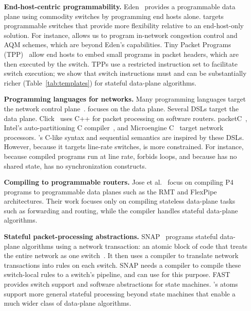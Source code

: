 \medskip
\noindent
\textbf{End-host-centric programmability.}
Eden~\cite{eden} provides a programmable data plane using commodity switches by
programming end hosts alone. \pktlanguage targets programmable switches that
provide more flexibility relative to an end-host-only solution. For instance,
\pktlanguage allows us to program in-network congestion control and AQM
schemes, which are beyond Eden's capabilities.  Tiny Packet Programs
(TPP)~\cite{tpp} allow end hosts to embed small programs in packet headers,
which are then executed by the switch. TPPs use a restricted instruction set to
facilitate switch execution; we show that switch instructions must and can be
substantially richer (Table~\ref{tab:templates}) for stateful data-plane
algorithms.

\medskip
\noindent
\textbf{Programming languages for networks.} Many programming languages target
the network control plane~\cite{frenetic, maple}. \pktlanguage focuses on the
data plane. Several DSLs target the data plane. Click~\cite{click} uses C++ for
packet processing on software routers. packetC~\cite{packetc}, Intel's
auto-partitioning C compiler~\cite{intel_uiuc_pldi}, and Microengine
C~\cite{microenginec} target network processors. \pktlanguage's C-like syntax
and sequential semantics are inspired by these DSLs. However, because it
targets line-rate switches, \pktlanguage is more constrained. For instance,
because compiled programs run at line rate, \pktlanguage forbids loops, and
because \absmachine has no shared state, \pktlanguage has no synchronization
constructs.

\medskip
\noindent
\textbf{Compiling to programmable routers.}
Jose et al.~\cite{lavanya_compiler} focus on compiling P4 programs to
programmable data planes such as the RMT and FlexPipe architectures. Their work
focuses only on compiling stateless data-plane tasks such as forwarding and
routing, while the \pktlanguage compiler handles stateful data-plane
algorithms.

\medskip
\noindent
\textbf{Stateful packet-processing abstractions.}
SNAP~\cite{snap} programs stateful data-plane algorithms using a network
transaction: an atomic block of code that treats the entire network as one
switch~\cite{onebigswitch}. It then uses a compiler to translate network
transactions into rules on each switch. SNAP needs a compiler to compile these
switch-local rules to a switch's pipeline, and can use \pktlanguage for this
purpose. FAST~\cite{fast} provides switch support and software abstractions for
state machines. \absmachine's atoms support more general stateful processing
beyond state machines that enable a much wider class of data-plane algorithms.

